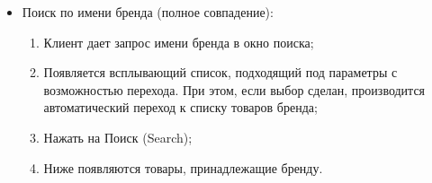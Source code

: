 {\begin{itogolong}
\begin{itemize}
\item	Поиск по имени бренда (полное совпадение):
 	\begin{enumerate} 
		\item	Клиент дает запрос имени бренда в окно поиска;
		\item	Появляется всплывающий список, подходящий под параметры с возможностью перехода. При этом, если выбор сделан, производится автоматический переход к списку товаров бренда;
		\item	Нажать на Поиск (Search);
		\item	Ниже появляются товары, принадлежащие бренду.
	\end{enumerate}	
\end{itemize}
\end{itogolong}



 
}



